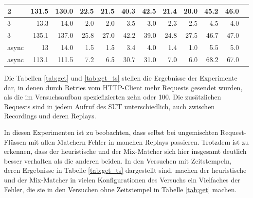 \documentclass[12pt,a4paper]{report}
\begin{document}
\begin{table}[H]
\begin{tabular}{|l|r|r|r|r|r|r|r|r|r|r|r|}
		2                        & 131.5                          & 130.0                          & 22.5                          & 21.5                          & 40.3                            & 42.5 & 21.4 & 20.0 & 45.2 & 46.0 \\ \hline
		3                        & 13.3                           & 14.0                           & 2.0                           & 2.0                           & 3.5                             & 3.0  & 2.3  & 2.5  & 4.5  & 4.0  \\ \hline
		3                        & 135.1                          & 137.0                          & 25.8                          & 27.0                          & 42.2                            & 39.0 & 24.8 & 27.5 & 46.7 & 47.0 \\ \hline
		async                    & 13                             & 14.0                           & 1.5                           & 1.5                           & 3.4                             & 4.0  & 1.4  & 1.0  & 5.5  & 5.0  \\ \hline
		async                    & 113.1                          & 111.5                          & 7.2                           & 6.5                           & 30.7                            & 31.0 & 7.0  & 6.0  & 68.2 & 67.0 \\ \hline
	\end{tabular}
\end{table}

Die Tabellen \ref{tab:get} und \ref{tab:get_ts} stellen die Ergebnisse der Experimente dar, in denen durch Retries vom HTTP-Client
mehr Requests gesendet wurden, als die im Versuchsaufbau speziefizierten zehn oder 100. Die zusätzlichen Requests sind in jedem
Aufruf des SUT unterschiedlich, auch zwischen Recordings und deren Replays.

In diesen Experimenten ist zu beobachten, dass selbst bei ungemischten Request-Flüssen mit allen Matchern Fehler in manchen
Replays passieren. Trotzdem ist zu erkennen, dass der heuristische und der Mix-Matcher sich hier insgesamt deutlich besser
verhalten als die anderen beiden. In den Versuchen mit Zeitstempeln, deren Ergebnisse in Tabelle \ref{tab:get_ts} dargestellt
sind, machen der heuristische und der Mix-Matcher in vielen Konfigurationen des Versuchs ein Vielfaches der Fehler, die sie in den
Versuchen ohne Zeitstempel in Tabelle \ref{tab:get} machen.
\end{document}
